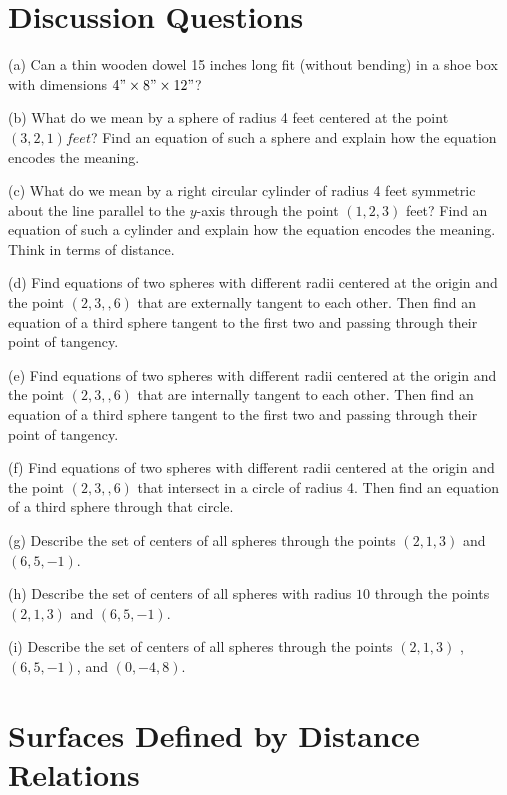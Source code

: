 \documentclass{ximera}
\begin{document}
\section{Discussion Questions}

\begin{question} \label{Q4934:Space}
(a) Can a thin wooden dowel 15 inches long fit (without bending) in a shoe box with dimensions $4"\times 8"\times 12"$?

(b) What do we mean by a sphere of radius 4 feet centered at the point $(3,2,1) feet$? Find an equation of such a sphere and explain how the equation encodes the meaning.

(c) What do we mean by a right circular cylinder of radius 4 feet symmetric about the line parallel to the $y$-axis through the point $(1,2,3)$ feet? Find an equation of such a cylinder and explain how the equation encodes the meaning. Think in terms of distance.

(d) Find equations of two spheres with different radii centered at the origin and the point $(2,3,,6)$ that are externally tangent to each other. Then find an equation of a third sphere tangent to the first two and passing through their point of tangency.

(e) Find equations of two spheres with different radii centered at the origin and the point $(2,3,,6)$ that are internally tangent to each other. Then find an equation of a third sphere tangent to the first two and passing through their point of tangency.

(f) Find equations of two spheres with different radii centered at the origin and the point $(2,3,,6)$ that intersect in a circle of radius 4. Then find an equation of a third sphere through that circle.

(g) Describe the set of centers of all spheres through the points $(2,1,3)$ and $(6,5,-1)$.

(h) Describe the set of centers of all spheres with radius $10$ through the points $(2,1,3)$ and $(6,5,-1)$.

(i) Describe the set of centers of all spheres through the points $(2,1,3)$ , $(6,5,-1)$, and $(0,-4,8)$.

\end{question}





\section{Surfaces Defined by Distance Relations}
\end{document}
